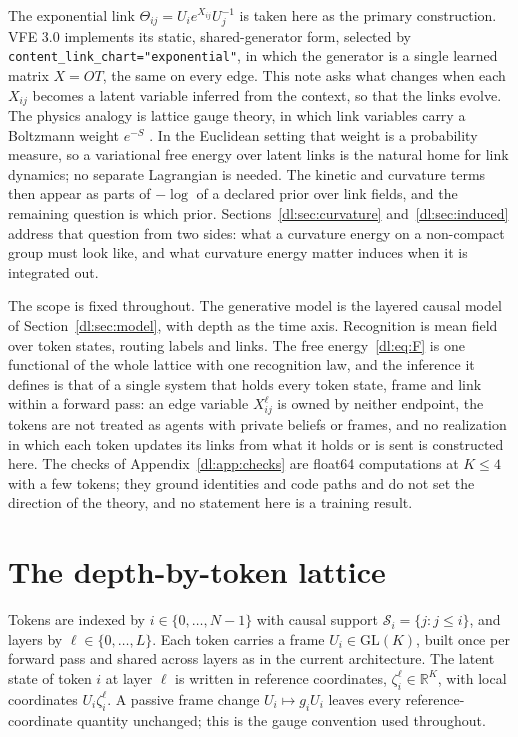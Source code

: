 \documentclass[11pt]{article}
\theoremstyle{definition}
\theoremstyle{remark}
\providecommand{\GL}{\mathrm{GL}}
\providecommand{\cfg}[1]{{\small\texttt{#1}}}
\newcommand{\R}{\mathbb R}
\begin{document}
The exponential link $\Theta_{ij}=U_ie^{X_{ij}}U_j^{-1}$ is taken here as the primary construction. VFE 3.0 implements its static, shared-generator form, selected by \cfg{content\_link\_chart="exponential"}, in which the generator is a single learned matrix $X=OT$, the same on every edge. This note asks what changes when each $X_{ij}$ becomes a latent variable inferred from the context, so that the links evolve. The physics analogy is lattice gauge theory, in which link variables carry a Boltzmann weight $e^{-S}$ \cite{dl:wilson1974,dl:kogut1975,dl:creutz1983}. In the Euclidean setting that weight is a probability measure, so a variational free energy over latent links is the natural home for link dynamics; no separate Lagrangian is needed. The kinetic and curvature terms then appear as parts of $-\log$ of a declared prior over link fields, and the remaining question is which prior. Sections~\ref{dl:sec:curvature} and~\ref{dl:sec:induced} address that question from two sides: what a curvature energy on a non-compact group must look like, and what curvature energy matter induces when it is integrated out.

The scope is fixed throughout. The generative model is the layered causal model of Section~\ref{dl:sec:model}, with depth as the time axis. Recognition is mean field over token states, routing labels and links. The free energy~\eqref{dl:eq:F} is one functional of the whole lattice with one recognition law, and the inference it defines is that of a single system that holds every token state, frame and link within a forward pass: an edge variable $X_{ij}^\ell$ is owned by neither endpoint, the tokens are not treated as agents with private beliefs or frames, and no realization in which each token updates its links from what it holds or is sent is constructed here. The checks of Appendix~\ref{dl:app:checks} are float64 computations at $K\le4$ with a few tokens; they ground identities and code paths and do not set the direction of the theory, and no statement here is a training result.

\section{The depth-by-token lattice}
\label{dl:sec:setting}

Tokens are indexed by $i\in\{0,\dots,N-1\}$ with causal support $\mathcal S_i=\{j:j\le i\}$, and layers by $\ell\in\{0,\dots,L\}$. Each token carries a frame $U_i\in\GL(K)$, built once per forward pass and shared across layers as in the current architecture. The latent state of token $i$ at layer $\ell$ is written in reference coordinates, $\zeta_i^\ell\in\R^K$, with local coordinates $U_i\zeta_i^\ell$. A passive frame change $U_i\mapsto g_iU_i$ leaves every reference-coordinate quantity unchanged; this is the gauge convention used throughout.
\end{document}
